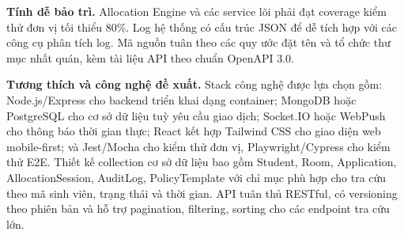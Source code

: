 ﻿\documentclass[a4paper,12pt,openany,oneside]{report}
\begin{document}
\textbf{Tính dễ bảo trì.} Allocation Engine và các service lõi phải đạt coverage
kiểm thử đơn vị tối thiểu 80\%. Log hệ thống có cấu trúc JSON để dễ tích hợp
với các công cụ phân tích log. Mã nguồn tuân theo các quy ước đặt tên và tổ chức
thư mục nhất quán, kèm tài liệu API theo chuẩn OpenAPI 3.0.

\textbf{Tương thích và công nghệ đề xuất.} Stack công nghệ được lựa chọn gồm:
Node.js/Express cho backend triển khai dạng container; MongoDB hoặc PostgreSQL
cho cơ sở dữ liệu tuỳ yêu cầu giao dịch; Socket.IO hoặc WebPush cho thông báo
thời gian thực; React kết hợp Tailwind CSS cho giao diện web mobile-first; và
Jest/Mocha cho kiểm thử đơn vị, Playwright/Cypress cho kiểm thử E2E. Thiết kế
collection cơ sở dữ liệu bao gồm Student, Room, Application, AllocationSession,
AuditLog, PolicyTemplate với chỉ mục phù hợp cho tra cứu theo mã sinh viên,
trạng thái và thời gian. API tuân thủ RESTful, có versioning theo phiên bản và
hỗ trợ pagination, filtering, sorting cho các endpoint tra cứu lớn.
\end{document}
